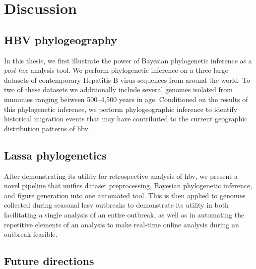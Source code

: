 \chapter{Discussion}\label{ch:discussion}

\section{HBV phylogeography}

In this thesis, we first illustrate the power of Bayesian phylogenetic inference as a \textit{post hoc} analysis tool.
We perform phylogenetic inference on a three large datasets of contemporary Hepatitis B virus sequences from around the world.
To two of these datasets we additionally include several genomes isolated from mummies ranging between 500--4,500 years in age.
Conditioned on the results of this phylogenetic inference, we perform phylogeographic inference to identify historical migration events that may have contributed to the current geographic distribution patterns of \gls{hbv}.

\section{Lassa phylogenetics}

After demonstrating its utility for retrospective analysis of \gls{hbv}, we present a novel pipeline that unifies dataset preprocessing, Bayesian phylogenetic inference, and figure generation into one automated tool.
This is then applied to genomes collected during seasonal \gls{lasv} outbreaks to demonstrate its utility in both facilitating a single analysis of an entire outbreak, as well as in automating the repetitive elements of an analysis to make real-time online analysis during an outbreak feasible.

\section{Future directions}

